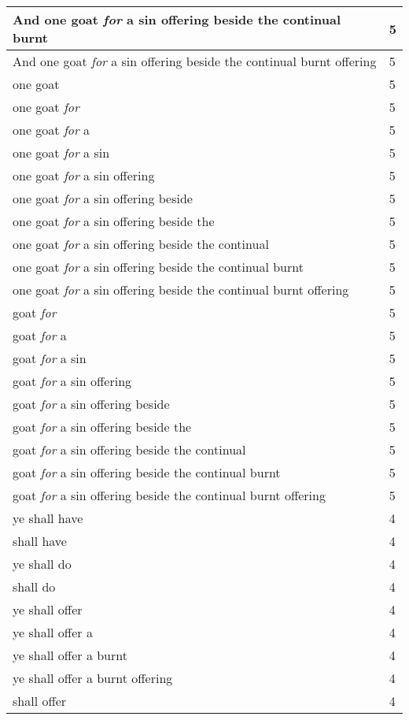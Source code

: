 \begin{center}
\begin{longtable}{|p{3.0in}|p{0.5in}|}
And one goat \emph{for} a sin offering beside the continual burnt & 5\\ \hline 
And one goat \emph{for} a sin offering beside the continual burnt offering & 5\\ \hline 
one goat & 5\\ \hline 
one goat \emph{for} & 5\\ \hline 
one goat \emph{for} a & 5\\ \hline 
one goat \emph{for} a sin & 5\\ \hline 
one goat \emph{for} a sin offering & 5\\ \hline 
one goat \emph{for} a sin offering beside & 5\\ \hline 
one goat \emph{for} a sin offering beside the & 5\\ \hline 
one goat \emph{for} a sin offering beside the continual & 5\\ \hline 
one goat \emph{for} a sin offering beside the continual burnt & 5\\ \hline 
one goat \emph{for} a sin offering beside the continual burnt offering & 5\\ \hline 
goat \emph{for} & 5\\ \hline 
goat \emph{for} a & 5\\ \hline 
goat \emph{for} a sin & 5\\ \hline 
goat \emph{for} a sin offering & 5\\ \hline 
goat \emph{for} a sin offering beside & 5\\ \hline 
goat \emph{for} a sin offering beside the & 5\\ \hline 
goat \emph{for} a sin offering beside the continual & 5\\ \hline 
goat \emph{for} a sin offering beside the continual burnt & 5\\ \hline 
goat \emph{for} a sin offering beside the continual burnt offering & 5\\ \hline 
ye shall have & 4\\ \hline 
shall have & 4\\ \hline 
ye shall do & 4\\ \hline 
shall do & 4\\ \hline 
ye shall offer & 4\\ \hline 
ye shall offer a & 4\\ \hline 
ye shall offer a burnt & 4\\ \hline 
ye shall offer a burnt offering & 4\\ \hline 
shall offer & 4\\ \hline 

\end{longtable}
\end{center}
